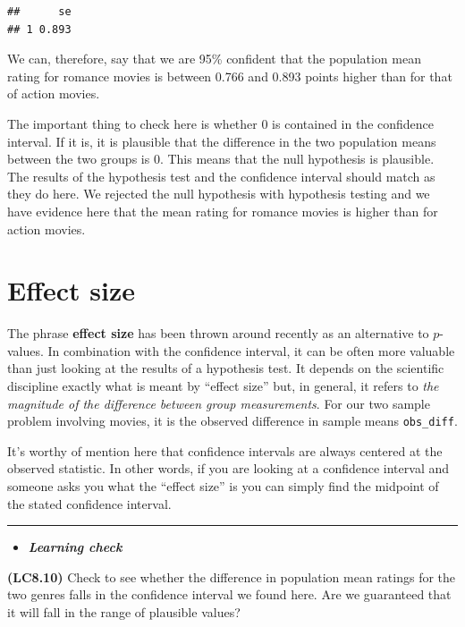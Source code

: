 \documentclass[]{tufte-book}
\let\oldrule=\rule
\renewcommand{\rule}[1]{\oldrule{\linewidth}}
\newenvironment{rmdblock}[1]
  {\begin{shaded*}
  \begin{itemize}
  \renewcommand{\labelitemi}{
    \raisebox{-.7\height}[0pt][0pt]{
    }
  }
  \item
  }
  {
  \end{itemize}
  \end{shaded*}
  }
\newenvironment{learncheck}
  {\begin{rmdblock}{warning}}
  {\end{rmdblock}}
\begin{document}
\begin{verbatim}
##      se
## 1 0.893
\end{verbatim}

We can, therefore, say that we are 95\% confident that the population
mean rating for romance movies is between 0.766 and 0.893 points higher
than for that of action movies.

The important thing to check here is whether 0 is contained in the
confidence interval. If it is, it is plausible that the difference in
the two population means between the two groups is 0. This means that
the null hypothesis is plausible. The results of the hypothesis test and
the confidence interval should match as they do here. We rejected the
null hypothesis with hypothesis testing and we have evidence here that
the mean rating for romance movies is higher than for action movies.

\section{Effect size}\label{effect-size}

The phrase \textbf{effect size} has been thrown around recently as an
alternative to \(p\)-values. In combination with the confidence
interval, it can be often more valuable than just looking at the results
of a hypothesis test. It depends on the scientific discipline exactly
what is meant by ``effect size'' but, in general, it refers to \emph{the
magnitude of the difference between group measurements}. For our two
sample problem involving movies, it is the observed difference in sample
means \texttt{obs\_diff}.

It's worthy of mention here that confidence intervals are always
centered at the observed statistic. In other words, if you are looking
at a confidence interval and someone asks you what the ``effect size''
is you can simply find the midpoint of the stated confidence interval.

\begin{center}\rule{0.5\linewidth}{\linethickness}\end{center}

\begin{learncheck}
\textbf{\emph{Learning check}}
\end{learncheck}

\textbf{(LC8.10)} Check to see whether the difference in population mean
ratings for the two genres falls in the confidence interval we found
here. Are we guaranteed that it will fall in the range of plausible
values?
\end{document}
